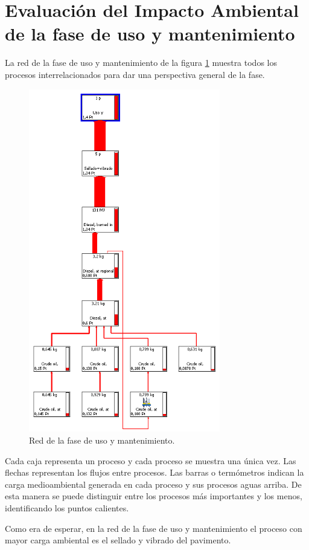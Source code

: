 \section{Evaluación del Impacto Ambiental de la fase de uso y mantenimiento}

La red de la fase de uso y mantenimiento de la figura \ref{fig:uso_red} muestra todos los procesos interrelacionados para dar una perspectiva general de la fase.

\begin{figure}[!htb]
\centering
\includegraphics[height=15cm]{img/uso_red.png}
\caption{Red de la fase de uso y mantenimiento.}
\label{fig:uso_red}
\end{figure}

Cada caja representa un proceso y cada proceso se muestra una única vez. Las flechas representan los flujos entre procesos. Las barras o termómetros indican la carga medioambiental generada en cada proceso y sus procesos aguas arriba. De esta manera se puede distinguir entre los procesos más importantes y los menos, identificando los puntos calientes.

Como era de esperar, en la red de la fase de uso y mantenimiento el proceso con mayor carga ambiental es el sellado y vibrado del pavimento.

